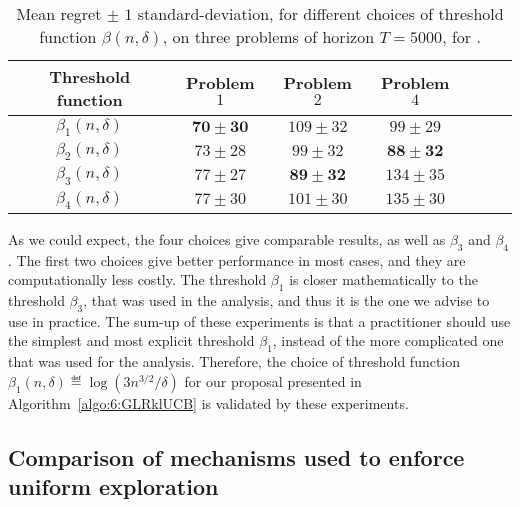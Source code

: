\begin{table}[ht]
    \centering
    \begin{tabular}{c|cccccc}
        \textbf{Threshold function} & Problem $1$ & Problem $2$ & Problem $4$ \\
        \hline
        $\beta_1(n,\delta)$ & $\mathbf{70 \pm 30}$ & $109 \pm 32$ & $99 \pm 29$ \\
        $\beta_2(n,\delta)$ & $73 \pm 28$ & $99 \pm 32$ & $\mathbf{88 \pm 32}$ \\
        $\beta_3(n,\delta)$ & $77 \pm 27$ & $\mathbf{89 \pm 32}$ & $134 \pm 35$ \\
        $\beta_4(n,\delta)$ & $77 \pm 30$ & $101 \pm 30$ & $135 \pm 30$
    \end{tabular}
    \caption{Mean regret $\pm$ $1$ standard-deviation, for different choices of threshold function $\beta(n,\delta)$, on three problems of horizon $T=5000$, for \GLRklUCB.}
    \label{table:6:exploringDifferentThresholdFunctions}
\end{table}

As we could expect, the four choices give comparable results, as well as $\beta_3$ and $\beta_4$. The first two choices give better performance in most cases, and they are computationally less costly.
The threshold $\beta_1$ is closer mathematically to the threshold $\beta_3$, that was used in the analysis, and thus it is the one we advise to use in practice.
The sum-up of these experiments is that a practitioner should use the simplest and most explicit threshold $\beta_1$, instead of the more complicated one that was used for the analysis.
Therefore, the choice of threshold function $\beta_1(n, \delta) \eqdef \log\left(3 n^{3/2} / \delta\right)$ for our proposal \GLRklUCB{} presented in Algorithm~\ref{algo:6:GLRklUCB} is validated by these experiments.


\subsection{Comparison of mechanisms used to enforce uniform exploration}\label{sec:6:exploringDifferentForcedExplorationMechanisms}

